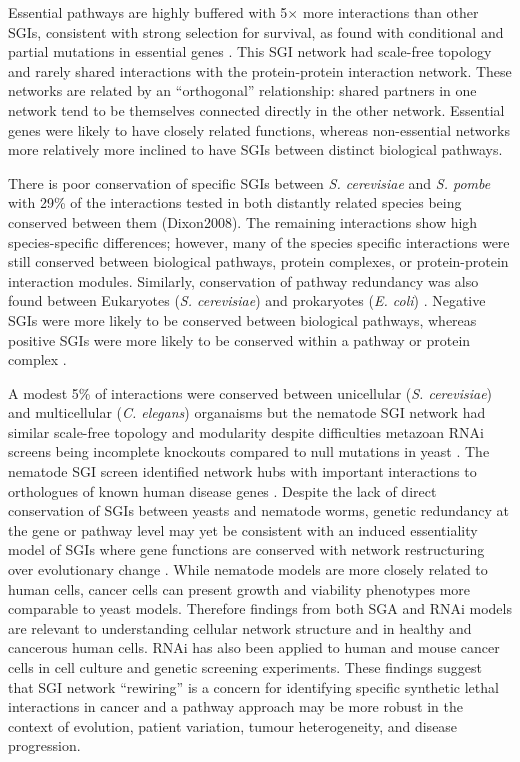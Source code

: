 Essential pathways are highly buffered with 5$\times$ more interactions than other SGIs, consistent with strong selection for survival, as found with conditional and partial mutations in essential genes \citep{Davierwala2005}. This SGI network had scale-free topology and rarely shared interactions with the protein-protein interaction network. These networks are related by an ``orthogonal'' relationship: shared partners in one network tend to be themselves connected directly in the other network. Essential genes were likely to have closely related functions, whereas non-essential networks more relatively more inclined to have SGIs between distinct biological pathways. 

There is poor conservation of specific SGIs between \textit{S. cerevisiae} and \textit{S. pombe} with 29\% of the interactions tested in both distantly related species being conserved between them (Dixon2008). The remaining interactions show high species-specific differences; however, many of the species specific interactions were still conserved between biological pathways, protein complexes, or protein-protein interaction modules. Similarly, conservation of pathway redundancy was also found between  Eukaryotes (\textit{S. cerevisiae}) and prokaryotes (\textit{E. coli}) \citep{Butland2008}. Negative SGIs were more likely to be conserved between biological pathways, whereas positive SGIs were more likely to be conserved within a pathway or protein complex \citep{Roguev2008}. 

A modest 5\% of interactions were conserved between unicellular (\textit{S. cerevisiae}) and multicellular (\textit{C. elegans}) organaisms but the nematode SGI network had similar scale-free topology and modularity despite difficulties metazoan RNAi screens being incomplete knockouts compared to null mutations in yeast \citep{Bussey2006}. The nematode SGI screen identified network hubs with important interactions to orthologues of known human disease genes \citep{Lehner2006}. Despite the lack of direct conservation of SGIs between yeasts and nematode worms, genetic redundancy at the gene or pathway level may yet be consistent with an induced essentiality model of SGIs where gene functions are conserved with network restructuring over evolutionary change \citep{Tischler2008}. While nematode models are more closely related to human cells, cancer cells can present growth and viability phenotypes more comparable to yeast models. Therefore findings from both SGA and RNAi models are relevant to understanding cellular network structure and in healthy and cancerous human cells. RNAi has also been applied to human and mouse cancer cells in cell culture and genetic screening experiments. These findings suggest that SGI network ``rewiring'' is a concern for identifying specific synthetic lethal interactions in cancer and a pathway approach may be more robust in the context of evolution, patient variation, tumour heterogeneity, and disease progression.  

